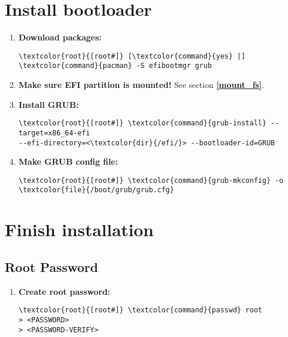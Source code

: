 \documentclass[10pt, a4paper, onecolumn, openany]{book} %
\begin{document}
\section{Install bootloader}
\begin{enumerate}
    \item \textbf{Download packages:}
\begin{Verbatim}[commandchars=\\\{\}]
\textcolor{root}{[root#]} [\textcolor{command}{yes} |] \textcolor{command}{pacman} -S efibootmgr grub
\end{Verbatim}
    \item \textbf{Make sure EFI partition is mounted!}
\newline See section \underline{\textbf{\ref{mount_fs}}}.
    \item \textbf{Install GRUB:}
\begin{Verbatim}[commandchars=\\\{\}]
\textcolor{root}{[root#]} \textcolor{command}{grub-install} --target=x86_64-efi
--efi-directory=<\textcolor{dir}{/efi/}> --bootloader-id=GRUB
\end{Verbatim}
    \item \textbf{Make GRUB config file:}
\begin{Verbatim}[commandchars=\\\{\}]
\textcolor{root}{[root#]} \textcolor{command}{grub-mkconfig} -o \textcolor{file}{/boot/grub/grub.cfg}
\end{Verbatim}
\end{enumerate}
\section{Finish installation}
\subsection{Root Password}
\begin{enumerate}
    \item \textbf{Create root password:}
\begin{Verbatim}[commandchars=\\\{\}]
\textcolor{root}{[root#]} \textcolor{command}{passwd} root
> <PASSWORD>
> <PASSWORD-VERIFY>
\end{Verbatim}
\end{enumerate}
\end{document}
